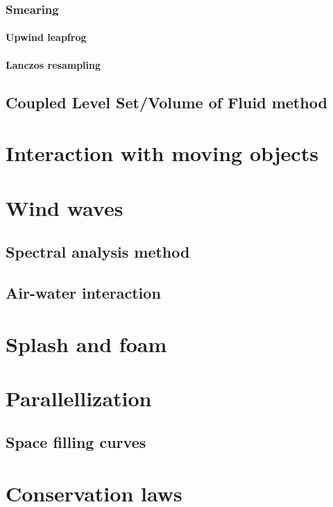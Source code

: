 \documentclass[a4paper]{report}
\begin{document}
\subsection{Smearing}

\subsubsection{Upwind leapfrog}

\subsubsection{Lanczos resampling}

\section{Coupled Level Set/Volume of Fluid  method}

\chapter{Interaction with moving objects}

\chapter{Wind waves}

\section{Spectral analysis method}

\section{Air-water interaction}

\chapter{Splash and foam}

\chapter{Parallellization}

\section{Space filling curves}

\chapter{Conservation laws}
\end{document}
